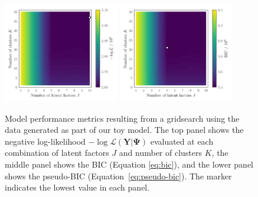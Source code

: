 \documentclass[twocolumn]{aastex62}
\newcommand{\vect}[1]{\boldsymbol{\mathbf{#1}}}
\renewcommand{\vec}[1]{\vect{#1}}
\newcommand{\data}{\textbf{Y}}
\newcommand{\transpose}{^\intercal}
\newcommand{\eye}{\textbf{I}}
\newcommand{\NumLatentFactors}{J}
\newcommand{\NumComponents}{K}
\begin{document}
\begin{figure}
	\includegraphics[width=0.45\textwidth]{experiments/exp1-gridsearch-ll-contours.png}
	\includegraphics[width=0.45\textwidth]{experiments/exp1-gridsearch-bic-contours.png}
    \caption{Model performance metrics resulting from a gridsearch using the
    		 data generated as part of our toy model. The top 
		 	 panel shows the negative log-likelihood 
			 $-\log{\mathcal{L}\left(\data|\vec\Psi\right)}$ 
			 evaluated at each combination of latent factors $J$ and number 
			 of clusters $K$, the middle panel shows the BIC (Equation \ref{eq:bic}), 
			 and the lower panel shows
			 the pseudo-BIC
			 (Equation~\ref{eq:pseudo-bic}). The marker indicates the 
			 lowest value in each panel.}
    \label{fig:experiment-1-gridsearch}
\end{figure}




\end{document}
